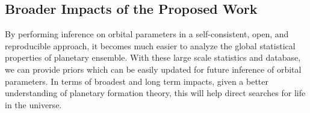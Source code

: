\subsection{Broader Impacts of the Proposed Work} 
By performing inference on orbital parameters in a self-consistent, open, and reproducible approach, it becomes much easier to analyze the global statistical properties of planetary ensemble.
With these large scale statistics and database, we can provide priors which can be easily updated for future inference of orbital parameters.
In terms of broadest and long term impacts, given a better understanding of planetary formation theory, this will help direct searches for life in the universe.






